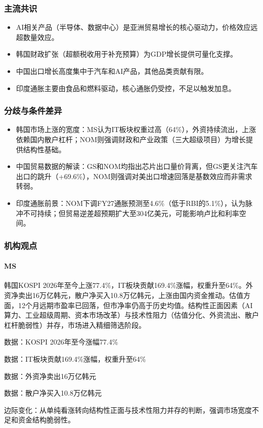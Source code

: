 \documentclass[11pt]{ctexart}
\begin{document}
\subsubsection*{主流共识}
\begin{itemize}
  \item AI相关产品（半导体、数据中心）是亚洲贸易增长的核心驱动力，价格效应远超数量效应。
  \item 韩国财政扩张（超额税收用于补充预算）为GDP增长提供可量化支撑。
  \item 中国出口增长高度集中于汽车和AI产品，其他品类贡献有限。
  \item 印度通胀主要由食品和燃料驱动，核心通胀仍受控，不足以触发加息。
\end{itemize}
\subsubsection*{分歧与条件差异}
\begin{itemize}
  \item 韩国市场上涨的宽度：MS认为IT板块权重过高（64\%），外资持续流出，上涨依赖国内散户杠杆；NOM则强调财政和产业政策（三大超级项目）为增长提供结构性基础。
  \item 中国贸易数据的解读：GS和NOM均指出芯片出口量价背离，但GS更关注汽车出口的跳升（+69.6\%），NOM则强调对美出口增速回落是基数效应而非需求转弱。
  \item 印度通胀前景：NOM下调FY27通胀预测至4.6\%（低于RBI的5.1\%），认为脉冲不可持续；但贸易逆差超预期扩大至304亿美元，可能影响卢比和利率空间。
\end{itemize}
\subsubsection*{机构观点}
\paragraph{MS} 韩国KOSPI 2026年至今上涨77.4\%，IT板块贡献169.4\%涨幅，权重升至64\%。外资净卖出16万亿韩元，散户净买入10.8万亿韩元，上涨由国内资金推动。估值方面，12个月远期市盈率已回落，但市净率仍高于历史均值。结构性正面因素（AI算力、工业超级周期、资本市场改革）与技术性阻力（估值分化、外资流出、散户杠杆脆弱性）并存，市场进入精细筛选阶段。
{\small\color{refgray}数据：KOSPI 2026年至今涨幅77.4\%\par}
{\small\color{refgray}数据：IT板块贡献169.4\%涨幅，权重升至64\%\par}
{\small\color{refgray}数据：外资净卖出16万亿韩元\par}
{\small\color{refgray}数据：散户净买入10.8万亿韩元\par}
{\small\color{refgray}边际变化：从单纯看涨转向结构性正面与技术性阻力并存的判断，强调市场宽度不足和资金结构脆弱性。\par}
\end{document}
